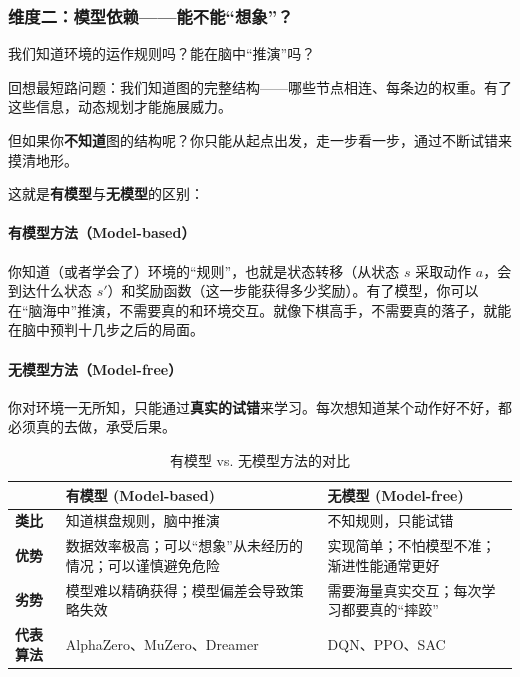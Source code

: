 \subsubsection{维度二：模型依赖——能不能“想象”？}

\begin{keyidea}[核心问题]
我们知道环境的运作规则吗？能在脑中“推演”吗？
\end{keyidea}

回想最短路问题：我们知道图的完整结构——哪些节点相连、每条边的权重。有了这些信息，动态规划才能施展威力。

但如果你\textbf{不知道}图的结构呢？你只能从起点出发，走一步看一步，通过不断试错来摸清地形。

这就是\textbf{有模型}与\textbf{无模型}的区别：

\paragraph{有模型方法（Model-based）}

你知道（或者学会了）环境的“规则”，也就是状态转移（从状态 $s$ 采取动作 $a$，会到达什么状态 $s'$）和奖励函数（这一步能获得多少奖励）。有了模型，你可以在“脑海中”推演，不需要真的和环境交互。就像下棋高手，不需要真的落子，就能在脑中预判十几步之后的局面。

\paragraph{无模型方法（Model-free）}

你对环境一无所知，只能通过\textbf{真实的试错}来学习。每次想知道某个动作好不好，都必须真的去做，承受后果。

\begin{table}[htbp]
\centering
\renewcommand{\arraystretch}{1.4}
\small
\begin{tabularx}{\textwidth}{p{2cm}|X|X}
\toprule
& \textbf{有模型 (Model-based)} & \textbf{无模型 (Model-free)} \\
\midrule
\textbf{类比} & 知道棋盘规则，脑中推演 & 不知规则，只能试错 \\
\midrule
\textbf{优势} & 
数据效率极高；可以“想象”从未经历的情况；可以谨慎避免危险
 & 
实现简单；不怕模型不准；渐进性能通常更好
 \\
\midrule
\textbf{劣势} & 
模型难以精确获得；模型偏差会导致策略失效
 & 
需要海量真实交互；每次学习都要真的“摔跤”
 \\
\midrule
\textbf{代表算法} & AlphaZero、MuZero、Dreamer & DQN、PPO、SAC \\
\bottomrule
\end{tabularx}
\caption{有模型 vs. 无模型方法的对比}
\end{table}


